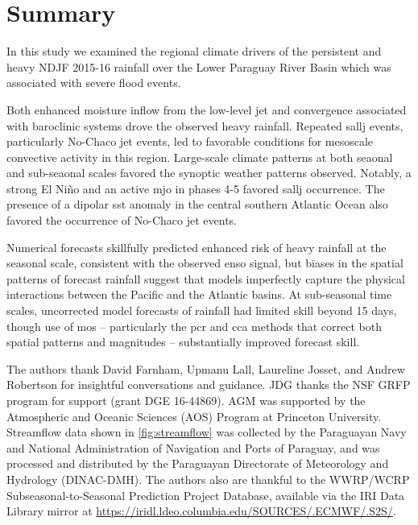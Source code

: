 \documentclass{ametsoc}
\begin{document}

\section{Summary}\label{sec:summary}

In this study we examined the regional climate drivers of the persistent and heavy NDJF 2015-16 rainfall over the Lower Paraguay River Basin which was associated with severe flood events.

Both enhanced moisture inflow from the low-level jet and convergence associated with baroclinic systems drove the observed heavy rainfall.
Repeated \gls{sallj} events, particularly No-Chaco jet events, led to favorable conditions for mesoscale convective activity in this region.
Large-scale climate patterns at both seaonal and sub-seaonal scales favored the synoptic weather patterns observed.
Notably, a strong El Ni\~{n}o and an active \gls{mjo} in phases 4-5 favored \gls{sallj} occurrence.
The presence of a dipolar \gls{sst} anomaly in the central southern Atlantic Ocean also favored the occurrence of No-Chaco jet events.

Numerical forecasts skillfully predicted enhanced risk of heavy rainfall at the seasonal scale, consistent with the observed \gls{enso} signal, but biases in the spatial patterns of forecast rainfall suggest that models imperfectly capture the physical interactions between the Pacific and the Atlantic basins.
At sub-seasonal time scales, uncorrected model forecasts of rainfall had limited skill beyond 15 days, though use of \acrlong{mos} -- particularly the \gls{pcr} and \gls{cca} methods that correct both spatial patterns and magnitudes -- substantially improved forecast skill.


\acknowledgments
The authors thank David Farnham, Upmanu Lall, Laureline Josset, and Andrew Robertson for insightful conversations and guidance.
JDG thanks the NSF GRFP program for support (grant DGE 16-44869).
AGM was supported by the Atmospheric and Oceanic Sciences (AOS) Program at Princeton University.
Streamflow data shown in \cref{fig:streamflow} was collected by the Paraguayan Navy and National Administration of Navigation and Ports of Paraguay, and was processed and distributed by the Paraguayan Directorate of Meteorology and Hydrology (DINAC-DMH).
The authors also are thankful to the WWRP/WCRP Subseasonal-to-Seasonal Prediction Project Database, available via the IRI Data Library mirror at \url{https://iridl.ldeo.columbia.edu/SOURCES/.ECMWF/.S2S/}.
\end{document}
